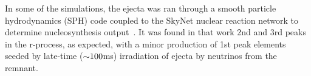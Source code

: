 In some of the \SpEC simulations, the ejecta was ran through a smooth particle hydrodynamics (SPH) code coupled to the SkyNet nuclear reaction network to determine nucleosynthesis output~\cite{Lippuner2015,Roberts:2016}.
It was found in that work 2nd and 3rd peaks in the r-process, as expected, with a minor production of 1st peak elements seeded by late-time ($\mathord{\sim}100$ms) irradiation of ejecta by neutrinos from the remnant. 